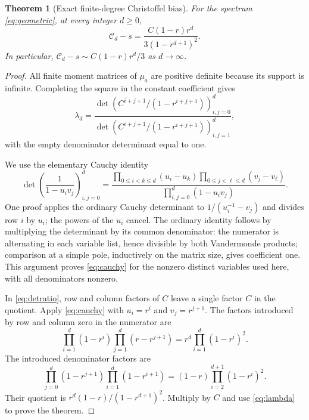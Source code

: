 \documentclass[11pt,letterpaper]{article}
\numberwithin{equation}{section}
\newtheorem{theorem}{Theorem}[section]
\theoremstyle{definition}
\theoremstyle{remark}
\newcommand{\Cs}{\mathcal C}
\begin{document}
\begin{theorem}[Exact finite-degree Christoffel bias]
\label{thm:geometric}
For the spectrum \eqref{eq:geometric}, at every integer $d\ge0$,
\begin{equation}
 \boxed{\displaystyle
  \Cs_d-s=\frac{C(1-r)r^d}{3(1-r^{d+1})^2}.}
 \label{eq:geometricbias}
\end{equation}
In particular, $\Cs_d-s\sim C(1-r)r^d/3$ as $d\to\infty$.
\end{theorem}
\begin{proof}
All finite moment matrices of $\mu_a$ are positive definite because its
support is infinite. Completing the square in the constant coefficient gives
\begin{equation}
 \lambda_d=
 \frac{\det\left(C^{i+j+1}/(1-r^{i+j+1})\right)_{i,j=0}^d}
      {\det\left(C^{i+j+1}/(1-r^{i+j+1})\right)_{i,j=1}^d},
 \label{eq:detratio}
\end{equation}
with the empty denominator determinant equal to one.

We use the elementary Cauchy identity
\begin{equation}
 \det\left(\frac1{1-u_iv_j}\right)_{i,j=0}^d
 =\frac{\prod_{0\le i<k\le d}(u_i-u_k)
          \prod_{0\le j<\ell\le d}(v_j-v_\ell)}
        {\prod_{i,j=0}^d(1-u_iv_j)}.
 \label{eq:cauchy}
\end{equation}
One proof applies the ordinary Cauchy determinant to
$1/(u_i^{-1}-v_j)$ and divides row $i$ by $u_i$; the powers of the $u_i$
cancel. The ordinary identity follows by multiplying the determinant by
its common denominator: the numerator is alternating in each variable list,
hence divisible by both Vandermonde products; comparison at a simple pole,
inductively on the matrix size, gives coefficient one. This argument proves
\eqref{eq:cauchy} for the nonzero distinct variables used here, with all
denominators nonzero.

In \eqref{eq:detratio}, row and column factors of $C$ leave a single factor
$C$ in the quotient. Apply \eqref{eq:cauchy} with $u_i=r^i$ and
$v_j=r^{j+1}$. The factors introduced by row and column zero in the numerator
are
\[
 \prod_{i=1}^d(1-r^i)\prod_{j=1}^d(r-r^{j+1})
 =r^d\prod_{i=1}^d(1-r^i)^2.
\]
The introduced denominator factors are
\[
 \prod_{j=0}^d(1-r^{j+1})\prod_{i=1}^d(1-r^{i+1})
 =(1-r)\prod_{i=2}^{d+1}(1-r^i)^2.
\]
Their quotient is $r^d(1-r)/(1-r^{d+1})^2$.
Multiply by $C$ and use \eqref{eq:lambda} to prove the theorem.
\end{proof}
\end{document}
